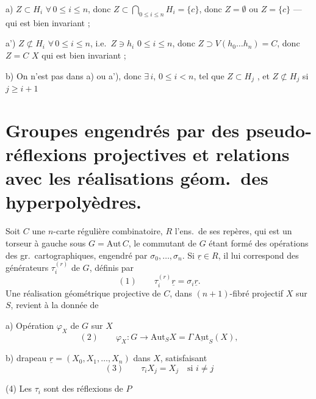 \documentclass[11pt,a4paper]{article}
\begin{document}
a) $Z \subset H_i$ $\forall\, 0 \leq i \leq n$, donc $Z \subset \bigcap_{0 \leq i \leq n} H_i = \{c\}$, donc $Z = \emptyset$ ou $Z = \{c\}$ --- qui est bien invariant ;

a') $Z \not\subset H_i$ $\forall\, 0 \leq i \leq n$, i.e.\ $Z \ni h_i$ $0 \leq i \leq n$, donc $Z \supset V(h_0 \dots h_n) = C$, donc $Z = C$ \struck{\ill{}}  $X$ qui est bien invariant ;

b) On n'est pas dans a) ou a'), donc $\exists\, i$, $0 \leq i < n$, tel que $Z \subset H_j$ , et $Z \not\subset H_j$ si $j \geq i+1$

\section{Groupes engendrés par des pseudo-réflexions projectives et relations avec les réalisations géom.\ des \struck{\ill{}} hyperpolyèdres.}


Soit $C$ une $n$-carte régulière combinatoire, \struck{\ill{}} $R$ l'ens.\ de ses repères, qui est un torseur à gauche sous $G = \mathrm{Aut}\, C$, le commutant de $G$ étant formé des opérations des gr.\ cartographiques, engendré par $\sigma_0, \dots, \sigma_n$. Si $\underline{r} \in R$, il lui correspond des générateurs $\tau_i^{(r)}$ de $G$, définis par
\[
(1) \qquad \tau_i^{(r)} \underline{r} = \sigma_i \underline{r} .
\]
Une réalisation géométrique projective de $C$, dans \struck{\ill{}} $(n+1)$-fibré projectif $X$ sur $S$, revient à la donnée de

a) Opération $\varphi_X$ de $G$ sur $X$
\[
(2) \qquad \varphi_X : G \to \mathrm{Aut}_S X = \Gamma\, \underline{\mathrm{Aut}}_S(X) ,
\]

b) drapeau \add{\ill{}} $\underline{r} = (X_0, X_1, \dots, X_n)$  dans $X$, satisfaisant
\[
(3) \qquad \tau_i X_j = X_j \quad \text{si } i \neq j
\]

(4) Les $\tau_i$ sont des réflexions de $P$
\end{document}
